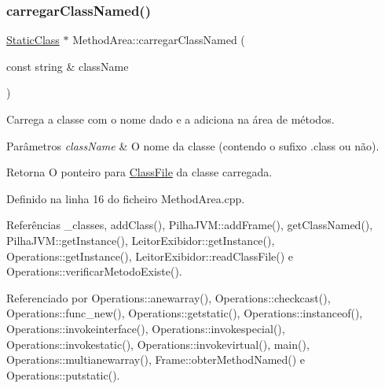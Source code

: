 \subsubsection{\texorpdfstring{carregar\+Class\+Named()}{carregarClassNamed()}}
{\footnotesize\ttfamily \hyperlink{classStaticClass}{Static\+Class} $\ast$ Method\+Area\+::carregar\+Class\+Named (\begin{DoxyParamCaption}\item[{const string \&}]{class\+Name }\end{DoxyParamCaption})}



Carrega a classe com o nome dado e a adiciona na área de métodos. 


\begin{DoxyParams}{Parâmetros}
{\em class\+Name} & O nome da classe (contendo o sufixo .class ou não). \\
\hline
\end{DoxyParams}
\begin{DoxyReturn}{Retorna}
O ponteiro para {\ttfamily \hyperlink{classClassFile}{Class\+File}} da classe carregada. 
\end{DoxyReturn}


Definido na linha 16 do ficheiro Method\+Area.\+cpp.



Referências \+\_\+classes, add\+Class(), Pilha\+J\+V\+M\+::add\+Frame(), get\+Class\+Named(), Pilha\+J\+V\+M\+::get\+Instance(), Leitor\+Exibidor\+::get\+Instance(), Operations\+::get\+Instance(), Leitor\+Exibidor\+::read\+Class\+File() e Operations\+::verificar\+Metodo\+Existe().



Referenciado por Operations\+::anewarray(), Operations\+::checkcast(), Operations\+::func\+\_\+new(), Operations\+::getstatic(), Operations\+::instanceof(), Operations\+::invokeinterface(), Operations\+::invokespecial(), Operations\+::invokestatic(), Operations\+::invokevirtual(), main(), Operations\+::multianewarray(), Frame\+::obter\+Method\+Named() e Operations\+::putstatic().

